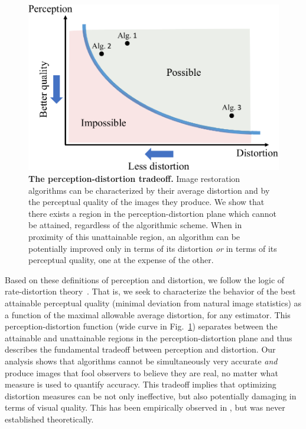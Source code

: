 \begin{figure}[]
	\begin{center}
		\includegraphics[width=0.87\linewidth]{figures/subObjPlane.pdf}
	\end{center}
	\caption{\textbf{The perception-distortion tradeoff.} Image restoration algorithms can be characterized by their average distortion and by the perceptual quality of the images they produce. We show that there exists a region in the perception-distortion plane which cannot be attained, regardless of the algorithmic scheme. When in proximity of this unattainable region, an algorithm can be potentially improved only in terms of its distortion \emph{or} in terms of its perceptual quality, one at the expense of the other.}
	\label{fig:subObjPlane}
\end{figure}

Based on these definitions of perception and distortion, we follow the logic of rate-distortion theory~\cite{cover2012elements}. That is, we seek to characterize the behavior of the best attainable perceptual quality (minimal deviation from natural image statistics) as a function of the maximal allowable average distortion, for any estimator. This perception-distortion function (wide curve in Fig.~\ref{fig:subObjPlane}) separates between the attainable and unattainable regions in the perception-distortion plane and thus describes the fundamental tradeoff between perception and distortion. Our analysis shows that algorithms cannot be simultaneously very accurate \emph{and} produce images that fool observers to believe they are real, no matter what measure is used to quantify accuracy. This tradeoff implies that optimizing distortion measures can be not only ineffective, but also potentially damaging in terms of visual quality. This has been empirically observed \eg in \cite{ledig2016photo,johnson2016perceptual,sajjadi2017enhancenet,yeh2017semantic,dahl2017pixel}, but was never established theoretically.

